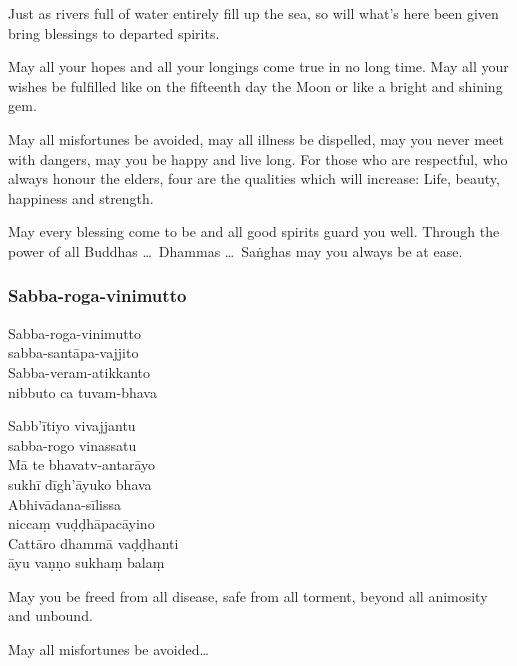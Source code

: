 Just as rivers full of water entirely fill up the sea, so will what's here been
given bring blessings to departed spirits.


May all your hopes and all your longings come true in no long time. May all your
wishes be fulfilled like on the fifteenth day the Moon or like a bright and
shining gem.


May all misfortunes be avoided, may all illness be dispelled, may you never meet
with dangers, may you be happy and live long. For those who are respectful, who
always honour the elders, four are the qualities which will increase: Life,
beauty, happiness and strength.


May every blessing come to be and all good spirits guard you well. Through the
power of all Buddhas \ldots\ Dhammas \ldots\ Saṅghas may you always be at ease.

\subsubsection{Sabba-roga-vinimutto}



\bigskip

\begin{paritta}
  Sabba-roga-vinimutto\\\vin sabba-santāpa-vajjito\\
  Sabba-veram-atikkanto\\\vin nibbuto ca tuvam-bhava

  Sabb'ītiyo vivajjantu\\\vin sabba-rogo vinassatu\\
  Mā te bhavatv-antarāyo\\\vin sukhī dīgh'āyuko bhava\\
  Abhivādana-sīlissa\\\vin niccaṃ vuḍḍhāpacāyino\\
  Cattāro dhammā vaḍḍhanti\\\vin āyu vaṇṇo sukhaṃ balaṃ 
\end{paritta}

\bigskip

\begin{english}
May you be freed from all disease, safe from all torment, beyond all animosity
and unbound.

May all misfortunes be avoided\ldots
\end{english}

